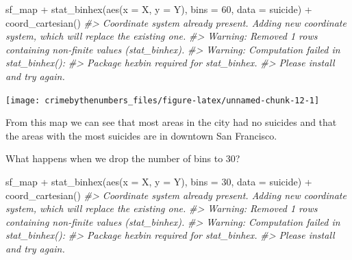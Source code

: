 \documentclass[
  12pt,
]{book}
\newenvironment{Shaded}{\begin{snugshade}}{\end{snugshade}}
\newcommand{\AttributeTok}[1]{\textcolor[rgb]{0.61,0.61,0.61}{#1}}
\newcommand{\CommentTok}[1]{\textcolor[rgb]{0.37,0.37,0.37}{\textit{#1}}}
\newcommand{\DecValTok}[1]{\textcolor[rgb]{0.06,0.06,0.06}{#1}}
\newcommand{\FunctionTok}[1]{\textcolor[rgb]{0,0,0}{#1}}
\newcommand{\NormalTok}[1]{#1}
\newcommand{\SpecialCharTok}[1]{\textcolor[rgb]{0,0,0}{#1}}
\begin{document}
\begin{Shaded}
\begin{Highlighting}[]
\NormalTok{sf\_map }\SpecialCharTok{+}
  \FunctionTok{stat\_binhex}\NormalTok{(}\FunctionTok{aes}\NormalTok{(}\AttributeTok{x =}\NormalTok{ X, }\AttributeTok{y =}\NormalTok{ Y),}
              \AttributeTok{bins =} \DecValTok{60}\NormalTok{,}
              \AttributeTok{data =}\NormalTok{ suicide) }\SpecialCharTok{+}
  \FunctionTok{coord\_cartesian}\NormalTok{() }
\CommentTok{\#\textgreater{} Coordinate system already present. Adding new coordinate system, which will replace the existing one.}
\CommentTok{\#\textgreater{} Warning: Removed 1 rows containing non{-}finite values (stat\_binhex).}
\CommentTok{\#\textgreater{} Warning: Computation failed in \textasciigrave{}stat\_binhex()\textasciigrave{}:}
\CommentTok{\#\textgreater{}   Package \textasciigrave{}hexbin\textasciigrave{} required for \textasciigrave{}stat\_binhex\textasciigrave{}.}
\CommentTok{\#\textgreater{}   Please install and try again.}
\end{Highlighting}
\end{Shaded}

\begin{center}\texttt{[image: crimebythenumbers\_files/figure-latex/unnamed-chunk-12-1]} \end{center}

From this map we can see that most areas in the city had no suicides and that the areas with the most suicides are in downtown San Francisco.

What happens when we drop the number of bins to 30?

\begin{Shaded}
\begin{Highlighting}[]
\NormalTok{sf\_map }\SpecialCharTok{+}
  \FunctionTok{stat\_binhex}\NormalTok{(}\FunctionTok{aes}\NormalTok{(}\AttributeTok{x =}\NormalTok{ X, }\AttributeTok{y =}\NormalTok{ Y),}
              \AttributeTok{bins =} \DecValTok{30}\NormalTok{,}
              \AttributeTok{data =}\NormalTok{ suicide) }\SpecialCharTok{+}
  \FunctionTok{coord\_cartesian}\NormalTok{() }
\CommentTok{\#\textgreater{} Coordinate system already present. Adding new coordinate system, which will replace the existing one.}
\CommentTok{\#\textgreater{} Warning: Removed 1 rows containing non{-}finite values (stat\_binhex).}
\CommentTok{\#\textgreater{} Warning: Computation failed in \textasciigrave{}stat\_binhex()\textasciigrave{}:}
\CommentTok{\#\textgreater{}   Package \textasciigrave{}hexbin\textasciigrave{} required for \textasciigrave{}stat\_binhex\textasciigrave{}.}
\CommentTok{\#\textgreater{}   Please install and try again.}
\end{Highlighting}
\end{Shaded}
\end{document}
